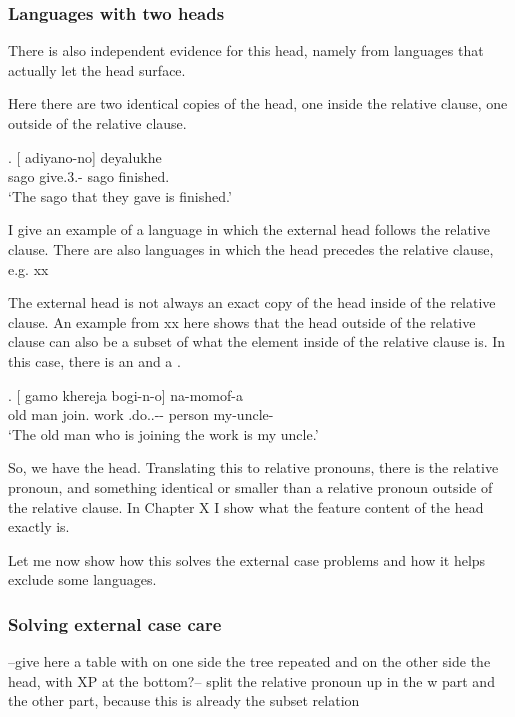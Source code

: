 \subsubsection{Languages with two heads}

There is also independent evidence for this head, namely from languages that actually let the head surface.

Here there are two identical copies of the head, one inside the relative clause, one outside of the relative clause.

\exg. [ adiyano-no]  deyalukhe\\
 sago give.3.- sago finished.\\
 `The sago that they gave is finished.' 

I give an example of a language in which the external head follows the relative clause. There are also languages in which the head precedes the relative clause, e.g. xx

The external head is not always an exact copy of the head inside of the relative clause. An example from xx here shows that the head outside of the relative clause can also be a subset of what the element inside of the relative clause is. In this case, there is an  and a .

\exg. [ gamo khereja bogi-n-o]  na-momof-a\\
 {old man} join. work .do..-- person my-uncle-\\
 `The old man who is joining the work is my uncle.'

So, we have the head. Translating this to relative pronouns, there is the relative pronoun, and something identical or smaller than a relative pronoun outside of the relative clause. In Chapter X I show what the feature content of the head exactly is.

Let me now show how this solves the external case problems and how it helps exclude some languages.


\subsubsection{Solving external case care}

--give here a table with on one side the tree repeated and on the other side the head, with XP at the bottom?--
split the relative pronoun up in the w part and the other part, because this is already the subset relation

